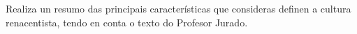 \begin{ejercicio}
Realiza un resumo das principais características que consideras definen a cultura renacentista, tendo en conta o texto do Profesor Jurado. 
\par
\vspace*{9.5cm}
\end{ejercicio}
%

